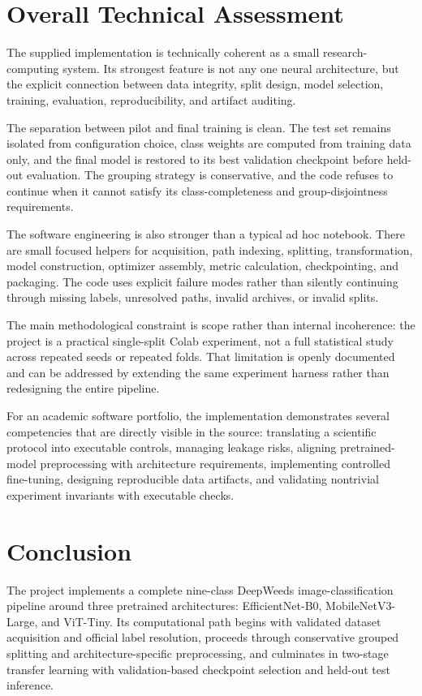 \documentclass[11pt,a4paper]{article}
\begin{document}
\section{Overall Technical Assessment}
The supplied implementation is technically coherent as a small research-computing system. Its strongest feature is not any one neural architecture, but the explicit connection between data integrity, split design, model selection, training, evaluation, reproducibility, and artifact auditing.

The separation between pilot and final training is clean. The test set remains isolated from configuration choice, class weights are computed from training data only, and the final model is restored to its best validation checkpoint before held-out evaluation. The grouping strategy is conservative, and the code refuses to continue when it cannot satisfy its class-completeness and group-disjointness requirements.

The software engineering is also stronger than a typical ad hoc notebook. There are small focused helpers for acquisition, path indexing, splitting, transformation, model construction, optimizer assembly, metric calculation, checkpointing, and packaging. The code uses explicit failure modes rather than silently continuing through missing labels, unresolved paths, invalid archives, or invalid splits.

The main methodological constraint is scope rather than internal incoherence: the project is a practical single-split Colab experiment, not a full statistical study across repeated seeds or repeated folds. That limitation is openly documented and can be addressed by extending the same experiment harness rather than redesigning the entire pipeline.

For an academic software portfolio, the implementation demonstrates several competencies that are directly visible in the source: translating a scientific protocol into executable controls, managing leakage risks, aligning pretrained-model preprocessing with architecture requirements, implementing controlled fine-tuning, designing reproducible data artifacts, and validating nontrivial experiment invariants with executable checks.

\section{Conclusion}
The project implements a complete nine-class DeepWeeds image-classification pipeline around three pretrained architectures: EfficientNet-B0, MobileNetV3-Large, and ViT-Tiny. Its computational path begins with validated dataset acquisition and official label resolution, proceeds through conservative grouped splitting and architecture-specific preprocessing, and culminates in two-stage transfer learning with validation-based checkpoint selection and held-out test inference.
\end{document}
